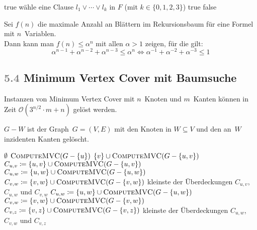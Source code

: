 \documentclass{cheat-sheet}
\renewcommand{\O}{\mathcal{O}} %
\newcommand{\Problem}[1]{\textcolor{ProblemColor}{\textbf{#1}}}
\newcommand{\scriptSection}[1]{\textcolor{gray}{#1}\enspace}
\begin{document}
\begin{algorithmic}
      \Return true
    \EndIf
    \State wähle eine Clause $l_1 \vee \cdots \vee l_k$ in $F$ (mit $k \in \{ 0, 1, 2, 3 \}$)
        \Return true
      \EndIf
    \EndFor
    \State \Return false
  \EndFunction
\end{algorithmic}

\begin{beweisskizze}
  Sei $f(n)$ die maximale Anzahl an Blättern im Rekursionsbaum für eine Formel mit $n$~Variablen. \\
  Dann kann man $f(n) \leq \alpha^n$ mit allen $\alpha > 1$ zeigen, für die gilt:
  \[
    \alpha^{n-1} + \alpha^{n-2} + \alpha^{n-3} \leq \alpha^n \iff
    \alpha^{-1} + \alpha^{-2} + \alpha^{-3} \leq 1
  \]
\end{beweisskizze}

\subsection{\scriptSection{5.4} \Problem{Minimum Vertex Cover} mit Baumsuche}

\begin{satz}
  Instanzen von Minimum Vertex Cover mit $n$~Knoten und $m$~Kanten können in Zeit $\O(3^{n/2} \cdot m + n)$ gelöst werden.
\end{satz}

\begin{nota}
  $G - W$ ist der Graph~$G = (V, E)$ mit den Knoten in $W \subseteq V$ und den an~$W$ inzidenten Kanten gelöscht.
\end{nota}

\begin{algorithmic}
     \Return $\emptyset$ \EndIf
      \State \Return $\Call{ComputeMVC}{G - \{ u \}}$
    \EndIf
      \State \Return $\{ v \} \cup \Call{ComputeMVC}{G - \{ u, v \}}$
    \EndIf
      \State $C_{u,v} \coloneqq \{u, v\} \cup \Call{ComputeMVC}{G - \{ u, v \}}$
      \State $C_{u,w} \coloneqq \{u, w\} \cup \Call{ComputeMVC}{G - \{ u, w \}}$
      \State $C_{v,w} \coloneqq \{v, w\} \cup \Call{ComputeMVC}{G - \{ v, w \}}$
      \State \Return kleinste der Überdeckungen $C_{u,v}$, $C_{u,w}$ und $C_{v,w}$
    \EndIf
      \State $C_{u,w} \coloneqq \{u, w\} \cup \Call{ComputeMVC}{G - \{ u, w \}}$
      \State $C_{v,w} \coloneqq \{v, w\} \cup \Call{ComputeMVC}{G - \{ v, w \}}$
      \State $C_{v,z} \coloneqq \{v, z\} \cup \Call{ComputeMVC}{G - \{ v, z \}}$
      \State \Return kleinste der Überdeckungen $C_{u,w}$, $C_{v,w}$ und $C_{v,z}$
    \EndIf
  \EndFunction
\end{algorithmic}
\end{document}
